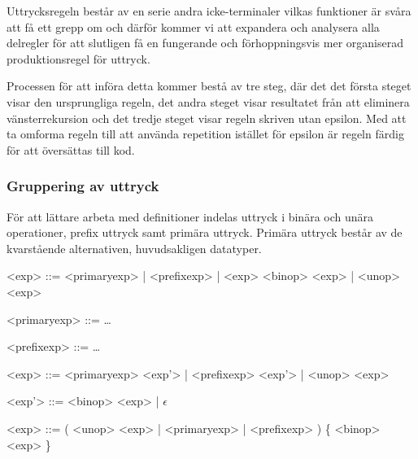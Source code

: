 Uttrycksregeln består av en serie andra icke-terminaler vilkas funktioner är
svåra att få ett grepp om och därför kommer vi att expandera och analysera
alla delregler för att slutligen få en fungerande och förhoppningsvis mer
organiserad produktionsregel för uttryck.

Processen för att införa detta kommer bestå av tre steg, där det det första
steget visar den ursprungliga regeln, det andra steget visar resultatet från
att eliminera vänsterrekursion och det tredje steget visar regeln skriven utan epsilon.
Med att ta omforma regeln till att använda repetition istället för epsilon är
regeln färdig för att översättas till kod.

\subsubsection{Gruppering av uttryck}

För att lättare arbeta med definitioner indelas uttryck i binära och unära
operationer, prefix uttryck samt primära uttryck. Primära uttryck består av de
kvarstående alternativen, huvudsakligen datatyper.


\begin{description}
  \setlength{\grammarindent}{5em}
  \item[Ursprungsregel] \hfill
    \begin{grammar}
      \singlespace\small%
      \selectfont
      <exp> ::= <primaryexp> | <prefixexp> | <exp> <binop> <exp> | <unop> <exp>

      <primaryexp> ::= \ldots

      <prefixexp> ::= \ldots
    \end{grammar}

  \item[Eliminering av vänsterrekursion] \hfill
    \begin{grammar}
      \singlespace\small%
      \selectfont
      <exp> ::= <primaryexp> <exp'> | <prefixexp> <exp'> | <unop> <exp>

      <exp'> ::= <binop> <exp> | $\epsilon$
    \end{grammar}

  \item[Resultat] \hfill
    \begin{grammar}
      \singlespace\small%
      \selectfont
      <exp> ::= ( <unop> <exp> | <primaryexp> | <prefixexp> ) \{ <binop> <exp> \}
    \end{grammar}
\end{description}

